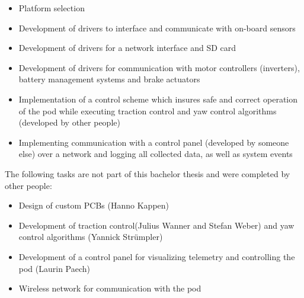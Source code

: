 \begin{itemize}
    \item Platform selection
    \item Development of drivers to interface and communicate with on-board sensors
    \item Development of drivers for a network interface and SD card
    \item Development of drivers for communication with motor controllers (inverters), battery management systems and brake actuators
    \item Implementation of a control scheme which insures safe and correct operation of the pod while executing traction control and yaw control algorithms (developed by other people)
    \item Implementing communication with a control panel (developed by someone else) over a network and logging all collected data, as well as system events
\end{itemize}

The following tasks are not part of this bachelor thesis and were completed by other people:

\begin{itemize}
    \item Design of custom PCBs (Hanno Kappen)
    \item Development of traction control(Julius Wanner and Stefan Weber) and yaw control algorithms (Yannick Strümpler)
    \item Development of a control panel for visualizing telemetry and controlling the pod (Laurin Paech)
    \item Wireless network for communication with the pod
\end{itemize}

